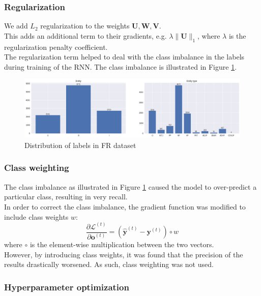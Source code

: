 \documentclass{article}
\numberwithin{equation}{section}
\begin{document}
\subsubsection{Regularization}
We add $L_2$ regularization to the weights $\bm{U}, \bm{W}, \bm{V}$.\\
This adds an additional term to their gradients, e.g. $\lambda \lVert\bm{U}\rVert_1$, where $\lambda$ is the regularization penalty coefficient.\\

The regularization term helped to deal with the class imbalance in the labels during training of the RNN. The class imbalance is illustrated in Figure \ref{fig:class-labels}.

\begin{figure}[h]
	\centering
	\includegraphics[width=0.9\linewidth]{assets/class_labels.png}
	\caption{Distribution of labels in FR dataset}
	\label{fig:class-labels}
\end{figure}

\subsubsection{Class weighting}
The class imbalance as illustrated in Figure \ref{fig:class-labels} caused the model to over-predict a particular class, resulting in very recall.\\

In order to correct the class imbalance, the gradient function was modified to include class weights $w$:
	$$ \frac{\partial \mathcal{L}^{(t)}}{\partial \bm{o}^{(t)}}
		= (\hat{\bm{y}}^{(t)} - \bm{y}^{(t)}) \circ w $$
where $\circ$ is the element-wise multiplication between the two vectors.\\

However, by introducing class weights, it was found that the precision of the results drastically worsened. As such, class weighting was not used.

\subsubsection{Hyperparameter optimization}
\end{document}
